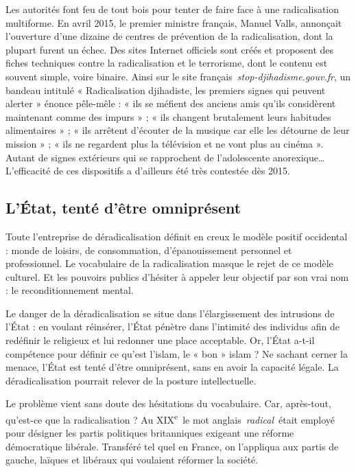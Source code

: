 Les autorités font feu de tout bois pour tenter de faire face à une
radicalisation multiforme. En avril 2015, le premier ministre français,
Manuel Valls, annonçait l'ouverture d'une dizaine de centres de
prévention de la radicalisation, dont la plupart furent un échec. Des
sites Internet officiels sont créés et proposent des fiches techniques
contre la radicalisation et le terrorisme, dont le contenu est souvent
simple, voire binaire. Ainsi sur le site
français~\emph{stop-djihadisme.gouv.fr}, un bandeau intitulé «
Radicalisation djihadiste, les premiers signes qui peuvent alerter »
énonce pêle-mêle : « ils se méfient des anciens amis qu'ils considèrent
maintenant comme des impurs » ; « ils changent brutalement leurs
habitudes alimentaires » ; « ils arrêtent d'écouter de la musique car
elle les détourne de leur mission » ; « ils ne regardent plus la
télévision et ne vont plus au cinéma ». Autant de signes extérieurs qui
se rapprochent de l'adolescente anorexique\ldots{} L'efficacité de ces
dispositifs a d'ailleurs été très contestée dès 2015.

\subsection{L'État, tenté d'être omniprésent}

Toute l'entreprise de déradicalisation définit en creux le modèle
positif occidental : monde de loisirs, de consommation, d'épanouissement
personnel et professionnel. Le vocabulaire de la radicalisation masque
le rejet de ce modèle culturel. Et les pouvoirs publics d'hésiter à
appeler leur objectif par son vrai nom : le reconditionnement mental.

Le danger de la déradicalisation se situe dans l'élargissement des
intrusions de l'État : en voulant réinsérer, l'État pénètre dans
l'intimité des individus afin de redéfinir le religieux et lui redonner
une place acceptable. Or, l'État a-t-il compétence pour définir ce
qu'est l'islam, le « bon » islam ? Ne sachant cerner la menace, l'État
est tenté d'être omniprésent, sans en avoir la capacité légale. La
déradicalisation pourrait relever de la posture intellectuelle.

Le problème vient sans doute des hésitations du vocabulaire. Car,
après-tout, qu'est-ce que la radicalisation ? Au
XIX\textsuperscript{e}~le mot anglais~\emph{radical}~était employé pour
désigner les partis politiques britanniques exigeant une réforme
démocratique libérale. Transféré tel quel en France, on l'appliqua aux
partis de gauche, laïques et libéraux qui voulaient réformer la société.

